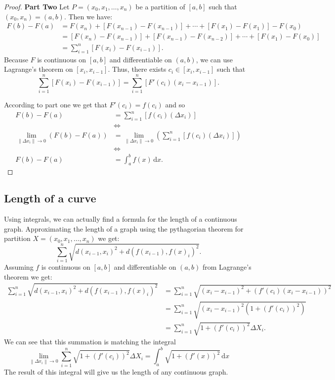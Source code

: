 \documentclass[11pt,a4paper]{article}
\theoremstyle{definition}
\theoremstyle{plain}
\newcommand\dx    {\,\mathrm{d}x}
\newcommand{\norm}[1]{\left\lVert #1\right\rVert}
\begin{document}
  \begin{proof}
  \textbf{Part Two}
  Let $P = (x_0, x_1, \ldots, x_n)$ be a partition of $[a,b]$ such 
  that $(x_0,x_n) = (a,b)$.
  Then we have:
  \begin{align*}
    F(b) - F(a) &= F(x_n) + \left[F(x_{n-1})-F(x_{n-1})\right] 
    + \cdots + \left[F(x_{1})-F(x_{1})\right] - F(x_0) \\
    &= \left[F(x_n)-F(x_{n-1})\right] + \left[F(x_{n-1})-F(x_{n-2})\right] 
    + \cdots + \left[F(x_1)-F(x_{0})\right] \\
    &= \sum_{i=1}^n{\left[F(x_{i})-F(x_{i-1})\right]}.
  \end{align*}
  Because $F$ is continuous on $[a,b]$ and differentiable on $(a,b)$, we can
  use Lagrange's theorem on $[x_i,x_{i-1}]$.
  Thus, there exists $c_i \in [x_i,x_{i-1}]$ such that
  \[
    \sum_{i=1}^n{\left[F(x_{i})-F(x_{i-1})\right]} 
    = \sum_{i=1}^n{\left[F'(c_i)(x_i-x_{i-1})\right]}.
  \]
  
  According to part one we get that $F'(c_i) = f(c_i)$ and so
  \begin{align*}
    F(b) - F(a) &= \sum_{i=1}^{n}{\left[f(c_i)(\Delta x_i)\right]} \\
    &\iff \\
    \lim_{\|\Delta x_i\|\to 0}{\left(F(b)-F(a)\right)} &= 
    \lim_{\|\Delta x_i\|\to 0}
    {\left(\sum_{i=1}^n{\left[f(c_i)(\Delta x_i)\right]}\right)} \\
    &\iff \\
    F(b)-F(a) &= \int_{a}^{b} f(x)\dx.
  \end{align*}
  \end{proof}
  
  \subsection{Length of a curve}
  Using integrals, we can actually find a formula for the length of a 
  continuous graph.
  Approximating the length of a graph using the pythagorian theorem for 
  partition $X = (x_0,x_1,\dots,x_n)$ we get:
  \[
    \sum_{i=1}^{n}{\sqrt{d(x_{i-1}, x_i)^2 + d(f(x_{i-1}), f(x)_i)^2}}.
  \]
  Assuming $f$ is continuous on $[a,b]$ and differentiable on $(a,b)$ 
  from Lagrange's theorem we get:
  \begin{align*}
    \sum_{i=1}^{n}{\sqrt{d(x_{i-1}, x_i)^2 + d(f(x_{i-1}), f(x)_i)^2}}
    &= \sum_{i=1}^{n}{\sqrt{(x_i - x_{i-1})^2 + (f'(c_i)(x_{i} - x_{i-1}))^2}}\\
    &= \sum_{i=1}^{n}{\sqrt{(x_i - x_{i-1})^2(1 + (f'(c_i))^2)}} \\
    &= \sum_{i=1}^{n}{\sqrt{1 + (f'(c_i))^2} \Delta X_i}.
  \end{align*}
  We can see that this summation is matching the integral
  \[
    \lim_{\norm{\Delta x_i} \to 0}{\sum_{i=1}^{n}
    {\sqrt{1 + (f'(c_i))^2}\Delta X_i}} = 
    \int_a^b{\sqrt{1 + (f'(x))^2}\dx}
  \]
  The result of this integral will give us the length of any continuous graph.
\end{document}
